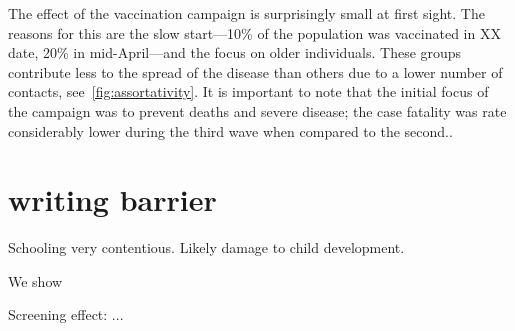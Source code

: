 The effect of the vaccination campaign is surprisingly small at first sight. The reasons for this are the slow start---10\% of the population was vaccinated in XX date, 20\% in mid-April---and the focus on older individuals. These groups contribute less to the spread of the disease than others due to a lower number of contacts, see~\ref{fig:assortativity}. It is important to note that the initial focus of the campaign was to prevent deaths and severe disease; the case fatality was rate considerably lower during the third wave when compared to the second..


\clearpage

\section*{writing barrier}

Schooling very contentious. Likely damage to child development.

We show

Screening effect: ...


